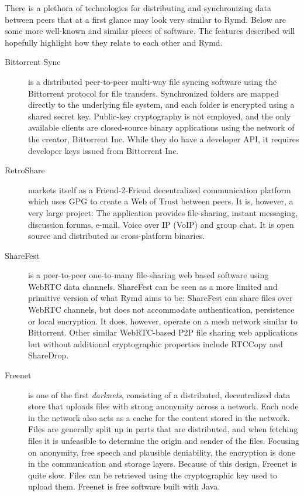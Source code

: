 There is a plethora of technologies for distributing and synchronizing data between peers that at a first glance may look very similar to Rymd. Below are some more well-known and similar pieces of software. The features described will hopefully highlight how they relate to each other and Rymd.

\begin{description}
  \item[Bittorrent Sync] \cite{BitTorent:2014:Online} is a distributed peer-to-peer multi-way file syncing software using the Bittorrent protocol for file transfers. Synchronized folders are mapped directly to the underlying file system, and each folder is encrypted using a shared secret key. Public-key cryptography is not employed, and the only available clients are closed-source binary applications using the network of the creator, Bittorrent Inc. While they do have a developer API, it requires developer keys issued from Bittorrent Inc.
  \item[RetroShare] \cite{Retroshare:2014:Online} markets itself as a Friend-2-Friend decentralized communication platform which uses GPG to create a Web of Trust between peers. It is, however, a very large project: The application provides file-sharing, instant messaging, discussion forums, e-mail, Voice over IP (VoIP) and group chat. It is open source and distributed as cross-platform binaries.
  \item[ShareFest] \cite{Sharefest:2014:Online} is a peer-to-peer one-to-many file-sharing web based software using WebRTC data channels. ShareFest can be seen as a more limited and primitive version of what Rymd aims to be: ShareFest can share files over WebRTC channels, but does not accommodate authentication, persistence or local encryption. It does, however, operate on a mesh network similar to Bittorrent. Other similar WebRTC-based P2P file sharing web applications but without additional cryptographic properties include RTCCopy and ShareDrop.
  \item[Freenet] \cite{Freenet:2014:Online} is one of the first \emph{darknets}, consisting of a distributed, decentralized data store that uploads files with strong anonymity across a network. Each node in the network also acts as a cache for the content stored in the network. Files are generally split up in parts that are distributed, and when fetching files it is unfeasible to determine the origin and sender of the files. Focusing on anonymity, free speech and plausible deniability, the encryption is done in the communication and storage layers. Because of this design, Freenet is quite slow. Files can be retrieved using the cryptographic key used to upload them. Freenet is free software built with Java.

\end{description}
